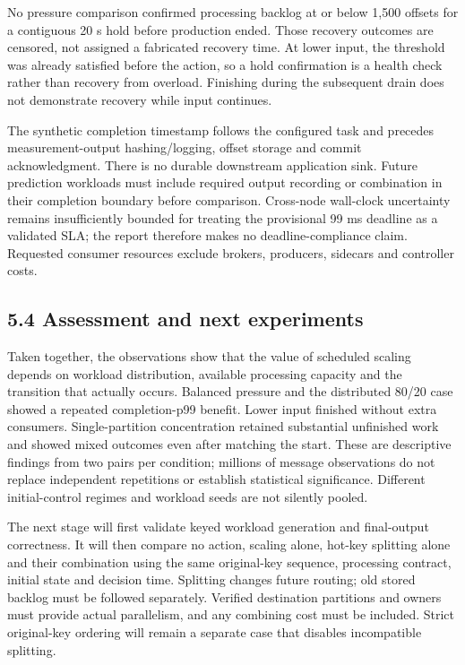 No pressure comparison confirmed processing backlog at or below 1,500 offsets for a contiguous 20 s hold before production ended. Those recovery outcomes are censored, not assigned a fabricated recovery time. At lower input, the threshold was already satisfied before the action, so a hold confirmation is a health check rather than recovery from overload. Finishing during the subsequent drain does not demonstrate recovery while input continues.

The synthetic completion timestamp follows the configured task and precedes measurement-output hashing/logging, offset storage and commit acknowledgment. There is no durable downstream application sink. Future prediction workloads must include required output recording or combination in their completion boundary before comparison. Cross-node wall-clock uncertainty remains insufficiently bounded for treating the provisional 99 ms deadline as a validated SLA; the report therefore makes no deadline-compliance claim. Requested consumer resources exclude brokers, producers, sidecars and controller costs.

\subsection*{5.4 Assessment and next experiments}

Taken together, the observations show that the value of scheduled scaling depends on workload distribution, available processing capacity and the transition that actually occurs. Balanced pressure and the distributed 80/20 case showed a repeated completion-p99 benefit. Lower input finished without extra consumers. Single-partition concentration retained substantial unfinished work and showed mixed outcomes even after matching the start. These are descriptive findings from two pairs per condition; millions of message observations do not replace independent repetitions or establish statistical significance. Different initial-control regimes and workload seeds are not silently pooled.

The next stage will first validate keyed workload generation and final-output correctness. It will then compare no action, scaling alone, hot-key splitting alone and their combination using the same original-key sequence, processing contract, initial state and decision time. Splitting changes future routing; old stored backlog must be followed separately. Verified destination partitions and owners must provide actual parallelism, and any combining cost must be included. Strict original-key ordering will remain a separate case that disables incompatible splitting.

